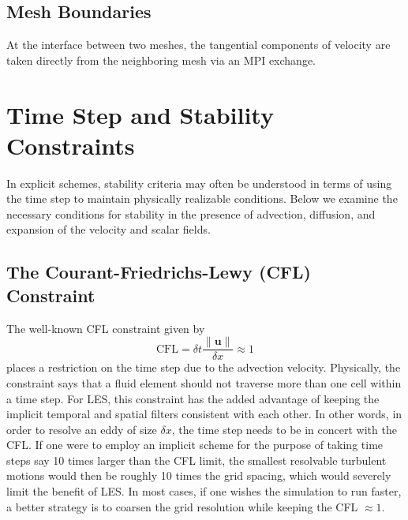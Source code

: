 \subsection{Mesh Boundaries}

At the interface between two meshes, the tangential components of velocity are taken directly from the neighboring mesh via an MPI exchange.




\newpage
\section{Time Step and Stability Constraints}
\label{stability}

In explicit schemes, stability criteria may often be understood in terms of using the time step to maintain physically realizable conditions.  Below we examine the necessary conditions for stability in the presence of advection, diffusion, and expansion of the velocity and scalar fields.

\subsection{The Courant-Friedrichs-Lewy (CFL) Constraint}

The well-known CFL constraint given by
\begin{equation}
\mbox{CFL} = \delta t \frac{\|\mathbf{u}\|}{\delta x} \approx 1
\end{equation}
places a restriction on the time step due to the advection velocity. Physically, the constraint says that a fluid element should not traverse more than one cell within a time step. For LES, this constraint has the added advantage of keeping the implicit temporal and spatial filters consistent with each other.  In other words, in order to resolve an eddy of size $\delta x$, the time step needs to be in concert with the CFL.  If one were to employ an implicit scheme for the purpose of taking time steps say 10 times larger than the CFL limit, the smallest resolvable turbulent motions would then be roughly 10 times the grid spacing, which would severely limit the benefit of LES.  In most cases, if one wishes the simulation to run faster, a better strategy is to coarsen the grid resolution while keeping the CFL $\approx 1$.


